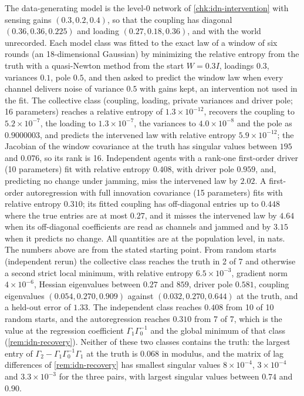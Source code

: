 \begin{numcheck}\label{chk:idn-recovery}
The data-generating model is the level-0 network of \cref{chk:idn-intervention} with sensing gains $(0.3,0.2,0.4)$, so that the coupling has diagonal $(0.36,0.36,0.225)$ and loading $(0.27,0.18,0.36)$, and with the world unrecorded. Each model class was fitted to the exact law of a window of six rounds (an 18-dimensional Gaussian) by minimizing the relative entropy from the truth with a quasi-Newton method from the start $W=0.3I$, loadings $0.3$, variances $0.1$, pole $0.5$, and then asked to predict the window law when every channel delivers noise of variance $0.5$ with gains kept, an intervention not used in the fit. The collective class (coupling, loading, private variances and driver pole; 16 parameters) reaches a relative entropy of $1.3\times10^{-12}$, recovers the coupling to $5.2\times10^{-7}$, the loading to $1.3\times10^{-7}$, the variances to $4.0\times10^{-8}$ and the pole as $0.9000003$, and predicts the intervened law with relative entropy $5.9\times10^{-12}$; the Jacobian of the window covariance at the truth has singular values between $195$ and $0.076$, so its rank is 16. Independent agents with a rank-one first-order driver (10 parameters) fit with relative entropy $0.408$, with driver pole $0.959$, and, predicting no change under jamming, miss the intervened law by $2.02$. A first-order autoregression with full innovation covariance (15 parameters) fits with relative entropy $0.310$; its fitted coupling has off-diagonal entries up to $0.448$ where the true entries are at most $0.27$, and it misses the intervened law by $4.64$ when its off-diagonal coefficients are read as channels and jammed and by $3.15$ when it predicts no change. All quantities are at the population level, in nats. The numbers above are from the stated starting point. From random starts (independent rerun) the collective class reaches the truth in 2 of 7 and otherwise a second strict local minimum, with relative entropy $6.5\times10^{-3}$, gradient norm $4\times10^{-6}$, Hessian eigenvalues between $0.27$ and $859$, driver pole $0.581$, coupling eigenvalues $(0.054,0.270,0.909)$ against $(0.032,0.270,0.644)$ at the truth, and a held-out error of $1.33$. The independent class reaches $0.408$ from 10 of 10 random starts, and the autoregression reaches $0.310$ from 7 of 7, which is the value at the regression coefficient $\Gamma_1\Gamma_0^{-1}$ and the global minimum of that class (\cref{rem:idn-recovery}). Neither of these two classes contains the truth: the largest entry of $\Gamma_2-\Gamma_1\Gamma_0^{-1}\Gamma_1$ at the truth is $0.068$ in modulus, and the matrix of lag differences of \cref{rem:idn-recovery} has smallest singular values $8\times10^{-4}$, $3\times10^{-4}$ and $3.3\times10^{-3}$ for the three pairs, with largest singular values between $0.74$ and $0.90$.
\end{numcheck}

